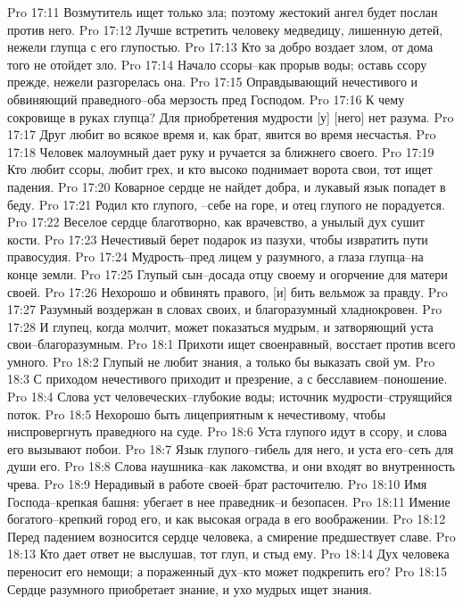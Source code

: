 Pro 17:11  Возмутитель ищет только зла; поэтому жестокий ангел будет послан против него.
Pro 17:12  Лучше встретить человеку медведицу, лишенную детей, нежели глупца с его глупостью.
Pro 17:13  Кто за добро воздает злом, от дома того не отойдет зло.
Pro 17:14  Начало ссоры--как прорыв воды; оставь ссору прежде, нежели разгорелась она.
Pro 17:15  Оправдывающий нечестивого и обвиняющий праведного--оба мерзость пред Господом.
Pro 17:16  К чему сокровище в руках глупца? Для приобретения мудрости [у] [него] нет разума.
Pro 17:17  Друг любит во всякое время и, как брат, явится во время несчастья.
Pro 17:18  Человек малоумный дает руку и ручается за ближнего своего.
Pro 17:19  Кто любит ссоры, любит грех, и кто высоко поднимает ворота свои, тот ищет падения.
Pro 17:20  Коварное сердце не найдет добра, и лукавый язык попадет в беду.
Pro 17:21  Родил кто глупого, --себе на горе, и отец глупого не порадуется.
Pro 17:22  Веселое сердце благотворно, как врачевство, а унылый дух сушит кости.
Pro 17:23  Нечестивый берет подарок из пазухи, чтобы извратить пути правосудия.
Pro 17:24  Мудрость--пред лицем у разумного, а глаза глупца--на конце земли.
Pro 17:25  Глупый сын--досада отцу своему и огорчение для матери своей.
Pro 17:26  Нехорошо и обвинять правого, [и] бить вельмож за правду.
Pro 17:27  Разумный воздержан в словах своих, и благоразумный хладнокровен.
Pro 17:28  И глупец, когда молчит, может показаться мудрым, и затворяющий уста свои--благоразумным.
Pro 18:1  Прихоти ищет своенравный, восстает против всего умного.
Pro 18:2  Глупый не любит знания, а только бы выказать свой ум.
Pro 18:3  С приходом нечестивого приходит и презрение, а с бесславием--поношение.
Pro 18:4  Слова уст человеческих--глубокие воды; источник мудрости--струящийся поток.
Pro 18:5  Нехорошо быть лицеприятным к нечестивому, чтобы ниспровергнуть праведного на суде.
Pro 18:6  Уста глупого идут в ссору, и слова его вызывают побои.
Pro 18:7  Язык глупого--гибель для него, и уста его--сеть для души его.
Pro 18:8  Слова наушника--как лакомства, и они входят во внутренность чрева.
Pro 18:9  Нерадивый в работе своей--брат расточителю.
Pro 18:10  Имя Господа--крепкая башня: убегает в нее праведник--и безопасен.
Pro 18:11  Имение богатого--крепкий город его, и как высокая ограда в его воображении.
Pro 18:12  Перед падением возносится сердце человека, а смирение предшествует славе.
Pro 18:13  Кто дает ответ не выслушав, тот глуп, и стыд ему.
Pro 18:14  Дух человека переносит его немощи; а пораженный дух--кто может подкрепить его?
Pro 18:15  Сердце разумного приобретает знание, и ухо мудрых ищет знания.
